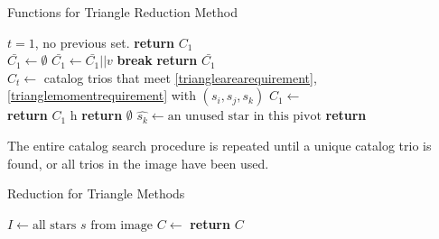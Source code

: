 \begin{algorithm}
\caption{Functions for Triangle Reduction Method} \label{Triangle Helpers}
\begin{algorithmic}[1]
 \Comment $t = 1$, no previous set.
\State \textbf{return} $C_1$ 
\EndIf
\\
\State $\bar{C_1} \gets \emptyset$ 
\State $\bar{C_1} \gets \bar{C_1} || v$
\State \textbf{break}
\EndIf
\EndFor
\EndFor
\State \textbf{return} $\bar{C_1}$
\EndFunction
\\

\State $C_t \gets $ catalog trios that meet \eqref{trianglearearequirement}, \eqref{trianglemomentrequirement} with $(s_i, s_j, s_k)$
\State $C_1 \gets $ 
\\

\State \textbf{return} $C_1$
h
\State \textbf{return} $\emptyset$
\Else
\State $\hat{s_k} \gets \text{an unused star in this pivot}$
\State \textbf{return} 
\EndIf
\EndFunction
\end{algorithmic}
\end{algorithm}

The entire catalog search procedure is repeated until a unique catalog trio is found, or all trios in the image have been used.

\begin{algorithm}
\caption{Reduction for Triangle Methods}
\label{Catalog Search}
\begin{algorithmic}[1]
\State $I \gets \text{all stars } s \text{ from image}$
\State $C \gets$ 
\State \textbf{return} $C$
\EndIf
\EndFor
\EndFor
\EndFor
\EndProcedure
\end{algorithmic}
\end{algorithm}

